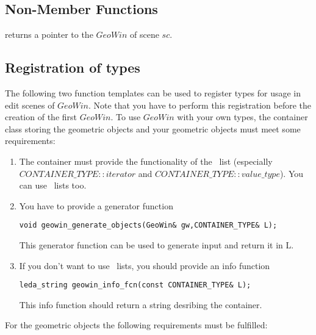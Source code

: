 \subsection{Non-Member Functions}

{
  returns a pointer to the $GeoWin$ of scene $sc$.
}

\subsection{Registration of types}

The following two function templates can be used to register types for usage
in edit scenes of $GeoWin$. Note that you have to perform this registration before the creation
of the first $GeoWin$.
To use $GeoWin$ with your
own types, the container class storing the geometric objects and your geometric
objects must meet some requirements:
\begin{enumerate}
\item The container must provide the functionality of the \stl\ list (especially 
$CONTAINER\_TYPE::iterator$ and $CONTAINER\_TYPE::value\_type$).
You can use \leda\ lists too.
\item You have to provide a generator function
\begin{verbatim}
void geowin_generate_objects(GeoWin& gw,CONTAINER_TYPE& L);
\end{verbatim}
This generator function can be used to generate input and return it in L.
\item If you don't want to use \leda\ lists, you should provide an info function
\begin{verbatim}
leda_string geowin_info_fcn(const CONTAINER_TYPE& L);
\end{verbatim}
This info function should return a string desribing the container.
\end{enumerate}
For the geometric objects the following requirements must be fulfilled:
